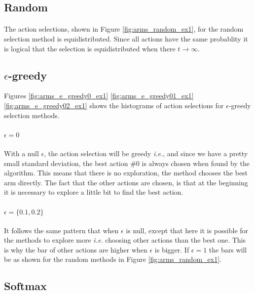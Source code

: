 \documentclass[letterpaper]{article}
\begin{document}
\subsection*{Random}

\paragraph{}

The action selections, shown in Figure \ref{fig:arms_random_ex1},
for the random selection method is equidistributed.
Since all actions have the same probablity it is logical that the selection
is equidistributed when there $t \to \infty$.

\subsection*{$\epsilon$-greedy}


Figures \ref{fig:arms_e_greedy0_ex1}
\ref{fig:arms_e_greedy01_ex1}
\ref{fig:arms_e_greedy02_ex1} shows the histograms of action selections
for $\epsilon$-greedy selection methods.

\paragraph{$\epsilon = 0$}

With a null $\epsilon$, the action selection will be greedy \textit{i.e.},
and since we have a pretty small standard deviation, the best action \#0
is always chosen when found by the algorithm. This means that there is
no exploration, the method chooses the best arm directly. The fact that
the other actions are chosen, is that at the beginning it is necessary
to explore a little bit to find the best action.

\paragraph{$\epsilon = \{0.1, 0.2\}$}

It follows the same pattern that when $\epsilon$ is null, except that here
it is possible for the methods to explore more \textit{i.e.} choosing
other actions than the best one. This is why the bar of other actions
are higher when $\epsilon$ is bigger. If $\epsilon = 1$ the bars will
be as shown for the random methods in Figure \ref{fig:arms_random_ex1}.

\subsection*{Softmax}
\end{document}
